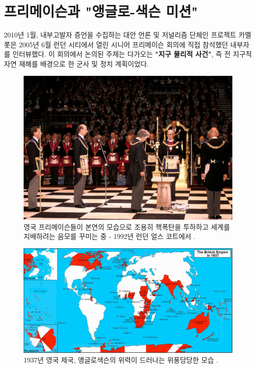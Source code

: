 \documentclass[10pt,twocolumn,letterpaper]{article}
\begin{document}
\section{프리메이슨과 "앵글로-색슨 미션"}

2010년 1월, 내부고발자 증언을 수집하는 대안 언론 및 저널리즘 단체인 프로젝트 카멜롯은 \cite{4,6} 2005년 6월 런던 시티에서 열린 시니어 프리메이슨 회의에 직접 참석했던 내부자를 인터뷰했다. 이 회의에서 논의된 주제는 다가오는 \textbf{"지구 물리적 사건"}, 즉 전 지구적 자연 재해를 배경으로 한 군사 및 정치 계획이었다.

\begin{figure}[b]
\begin{center}
   \includegraphics[width=1\linewidth]{freemason.jpg}

\end{center}
   \caption{영국 프리메이슨들이 본연의 모습으로 조용히 핵폭탄을 투하하고 세계를 지배하려는 음모를 꾸미는 중 - 1992년 런던 얼스 코트에서 \cite{5}.}
\label{fig:1}
\label{fig:onecol}
\end{figure}

\begin{figure}[t]
\begin{center}
\includegraphics[width=1\textwidth]{british.jpg}
\end{center}
   \caption{1937년 영국 제국, 앵글로색슨의 위력이 드러나는 위풍당당한 모습 \cite{14}.}
   \label{fig:2}
\end{figure}
\end{document}
